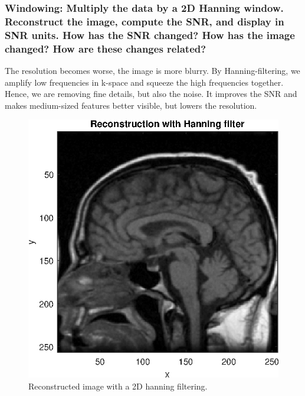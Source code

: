 \subsubsection{Windowing: Multiply the data by a 2D Hanning window. Reconstruct the image,
compute the SNR, and display in SNR units. How has the SNR changed? How has the
image changed? How are these changes related?}
The resolution becomes worse, the image is more blurry.
By Hanning-filtering, we amplify low frequencies in k-space and squeeze the high frequencies together. Hence, we are removing fine
details, but also the noise. It improves the SNR and makes medium-sized features better visible, but lowers the resolution.


\begin{figure}[h]
    \includegraphics[width=.85\linewidth] {./homework4/img/recon_hanning.eps}
    \caption{Reconstructed image with a 2D hanning filtering.}
    \label{fig:recon_hanning}
    \end{figure} 
    
